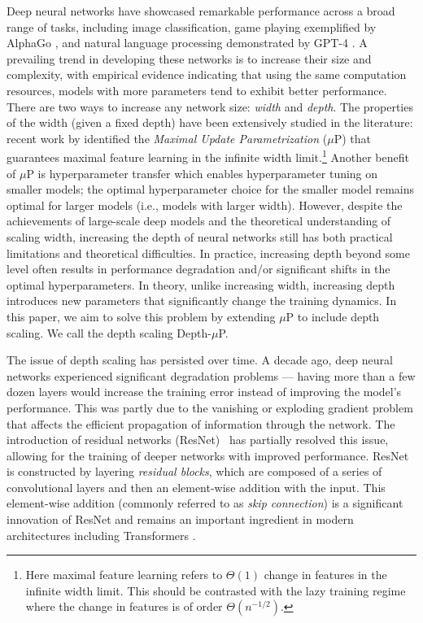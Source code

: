 \documentclass{article}
\theoremstyle{plain}
\theoremstyle{definition}
\begin{document}
Deep neural networks have showcased remarkable performance across a broad range of tasks, including image classification, game playing exemplified by AlphaGo \citep{alphago}, and natural language processing demonstrated by GPT-4 \citep{openai2023gpt4}. A prevailing trend in developing these networks is to increase their size and complexity, with empirical evidence indicating that using the same computation resources, models with more parameters tend to exhibit better performance. There are two ways to increase any network size: \emph{width} and \emph{depth}. The properties of the width (given a fixed depth) have been extensively studied in the literature: recent work by \citet{yang2022tensor} identified the \emph{Maximal Update Parametrization} ($\mu$P) that guarantees maximal feature learning in the infinite width limit.\footnote{Here maximal feature learning refers to $\Theta(1)$ change in features in the infinite width limit. This should be contrasted with the lazy training regime where the change in features is of order $\Theta(n^{-1/2})$.} Another benefit of $\mu$P is hyperparameter transfer which enables hyperparameter tuning on smaller models; the optimal hyperparameter choice for the smaller model remains optimal for larger models (i.e., models with larger width). However, despite the achievements of large-scale deep models and the theoretical understanding of scaling width, increasing the depth of neural networks still has both practical limitations and theoretical difficulties. In practice, increasing depth beyond some level often results in performance degradation and/or significant shifts in the optimal hyperparameters. In theory, unlike increasing width, increasing depth introduces new parameters that significantly change the training dynamics. In this paper, we aim to solve this problem by extending $\mu$P to include depth scaling. We call the depth scaling Depth-$\mu$P.

The issue of depth scaling has persisted over time. A decade ago, deep neural networks experienced significant degradation problems --- having more than a few dozen layers would increase the training error instead of improving the model's performance. This was partly due to the vanishing or exploding gradient problem that affects the efficient propagation of information through the network. The introduction of residual networks (ResNet)~\citep{he2016deep,he2016identity, srivastava2015highway} has partially resolved this issue, allowing for the training of deeper networks with improved performance. ResNet is constructed by layering \emph{residual blocks}, which are composed of a series of convolutional layers and then an element-wise addition with the input. This element-wise addition (commonly referred to as \emph{skip connection}) is a significant innovation of ResNet and remains an important ingredient in modern architectures including Transformers \citep{vaswani2017attention}. 
\end{document}
